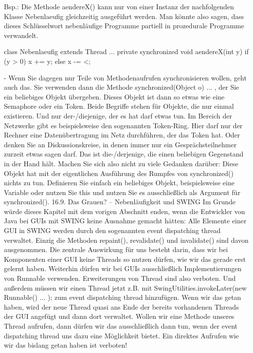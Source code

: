 Bsp.: Die Methode aendereX() kann nur von einer Instanz der nachfolgenden Klasse Nebenlaeufig gleichzeitig ausgeführt werden. Man könnte also sagen, dass dieses Schlüsselwort nebenläufige Programme partiell in prozedurale Programme verwandelt.

class Nebenlaeufig extends Thread {
	...
	private synchronized void aendereX(int y){
		if (y > 0)
		{x += y;}
		else
		{x -= <;}
	}
}

-	Wenn Sie dagegen nur Teile von Methodenaufrufen synchronisieren wollen, geht auch das. Sie verwenden dann die Methode synchronized(Object o) { ... }, der Sie ein beliebiges Objekt übergeben. Dieses Objekt ist dann so etwas wie eine Semaphore oder ein Token. Beide Begriffe stehen für Objekte, die nur einmal existieren. Und nur der-/diejenige, der es hat darf etwas tun. Im Bereich der Netzwerke gibt es beispielsweise den sogenannten Token-Ring. Hier darf nur der Rechner eine Datenübertragung im Netz durchführen, der das Token hat. Oder denken Sie an Diskussionskreise, in denen immer nur ein Gesprächsteilnehmer zurzeit etwas sagen darf. Das ist die-/derjenige, die einen beliebigen Gegenstand in der Hand hält. Machen Sie sich also nicht zu viele Gedanken darüber: Diese Objekt hat mit der eigentlichen Ausführung des Rumpfes von synchronized() nichts zu tun. Definieren Sie einfach ein beliebiges Objekt, beispielsweise eine Variable oder nutzen Sie this und nutzen Sie es ausschließlich als Argument für synchronized().
16.9.	Das Grauen? – Nebenläufigkeit und SWING
Im Grunde würde dieses Kapitel mit dem vorigen Abschnitt enden, wenn die Entwickler von Java bei GUIs mit SWING keine Ausnahme gemacht hätten: Alle Elemente einer GUI in SWING werden durch den sogenannten event dispatching thread verwaltet. Einzig die Methoden repaint(), revalidate() und invalidate() sind davon ausgenommen.
Die zentrale Auswirkung für uns besteht darin, dass wir bei Komponenten einer GUI keine Threads so nutzen dürfen, wie wir das gerade erst gelernt haben.
Weiterhin dürfen wir bei GUIs ausschließlich Implementierungen von Runnable verwenden. Erweiterungen von Thread sind also verboten.
Und außerdem müssen wir einen Thread jetzt z.B. mit 
SwingUtilities.invokeLater(new Runnable() {...} ); zum event dispatching thread hinzufügen. Wenn wir das getan haben, wird der neue Thread quasi ans Ende der bereits vorhandenen Threads der GUI angefügt und dann dort verwaltet.
Wollen wir eine Methode unseres Thread aufrufen, dann dürfen wir das ausschließlich dann tun, wenn der event dispatching thread uns dazu eine Möglichkeit bietet. Ein direktes Aufrufen wie wir das bislang getan haben ist verboten!

